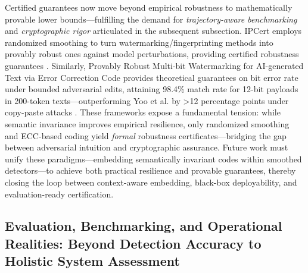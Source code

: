 \documentclass[11pt,a4paper]{article}
\begin{document}
Certified guarantees now move beyond empirical robustness to mathematically provable lower bounds---fulfilling the demand for \emph{trajectory-aware benchmarking} and \emph{cryptographic rigor} articulated in the subsequent subsection. IPCert employs randomized smoothing to turn watermarking/fingerprinting methods into provably robust ones against model perturbations, providing certified robustness guarantees \cite{doi:10.1109/cvpr52733.2024.01169}. Similarly, Provably Robust Multi-bit Watermarking for AI-generated Text via Error Correction Code provides theoretical guarantees on bit error rate under bounded adversarial edits, attaining 98.4\% match rate for 12-bit payloads in 200-token texts---outperforming Yoo et al. by >12 percentage points under copy-paste attacks \cite{arxiv:2401.16820}. These frameworks expose a fundamental tension: while semantic invariance improves empirical resilience, only randomized smoothing and ECC-based coding yield \emph{formal} robustness certificates---bridging the gap between adversarial intuition and cryptographic assurance. Future work must unify these paradigms---embedding semantically invariant codes within smoothed detectors---to achieve both practical resilience and provable guarantees, thereby closing the loop between context-aware embedding, black-box deployability, and evaluation-ready certification.


\subsection{Evaluation, Benchmarking, and Operational Realities: Beyond Detection Accuracy to Holistic System Assessment}
\end{document}
